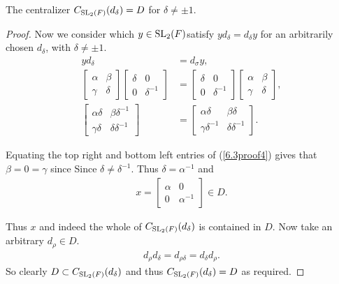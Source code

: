     

\begin{proposition}
    \label{centralizer_d_eq_D}
    \leanok
    The centralizer $C_{\operatorname{SL}_2(F)}(d_\delta) = D$ for $\delta \neq \pm 1$.
    \end{proposition}        
\begin{proof}
    \leanok
Now we consider which $y \in \operatorname{SL}_2(F)$satisfy $y d_\delta = d_\delta y$ for an arbitrarily chosen $d_\delta$, with $\delta \neq \pm 1$.
\begin{align}\label{6.3proof4} y d_ \delta &= d_\sigma y, \nonumber \\[1.5ex]
\begin{bmatrix} \alpha & \beta \\ \gamma & \delta \end{bmatrix} \begin{bmatrix} \delta & 0 \\ 0 & \delta^{-1} \end{bmatrix} &= \begin{bmatrix} \delta & 0 \\ 0 & \delta^{-1} \end{bmatrix} \begin{bmatrix} \alpha & \beta \\ \gamma & \delta \end{bmatrix}, \nonumber \\[1.5ex]
\begin{bmatrix} \alpha \delta & \beta \delta^{-1} \\ \gamma \delta & \delta \delta^{-1} \end{bmatrix} &= \begin{bmatrix} \alpha \delta & \beta \delta \\ \gamma \delta^{-1} & \delta \delta^{-1} \end{bmatrix}.
\end{align}

Equating the top right and bottom left entries of (\ref{6.3proof4}) gives that $\beta = 0 = \gamma$ since Since $\delta \neq \delta^{-1}$. Thus $\delta = \alpha^{-1}$ and 
\begin{align*} x = \begin{bmatrix} \alpha & 0 \\ 0 & \alpha^{-1} \end{bmatrix} \in D. 
\end{align*}

Thus $x$ and indeed the whole of $C_{\operatorname{SL}_2(F)}(d_\delta)$ is contained in $D$. Now take an arbitrary $d_\rho \in D$.
\begin{align*} d_\rho d_\delta = d_{\rho \delta} = d_\delta d_\rho.
\end{align*}
So clearly $D \subset C_{\operatorname{SL}_2(F)}(d_\delta)$ and thus $C_{\operatorname{SL}_2(F)}(d_\delta) = D$ as required.
\end{proof}
